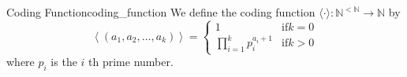 \begin{definition}
{Coding Function}{coding_function}
We define the coding function \(\langle\cdot\rangle: \mathbb{N}^{<\mathbb{N}}
\rightarrow \mathbb{N}\) by
\[
\left\langle\left(a_{1}, a_{2}, \ldots, a_{k}\right)\right\rangle =
\begin{cases}
1 & \text {if} k = 0 \\
 \prod_{i = 1}^{k} p_{i}^{a_{i}+1} & \text {if} k>0
\end{cases}
\]
where \(p_{i}\) is the \(i\) th prime number.
\end{definition}
